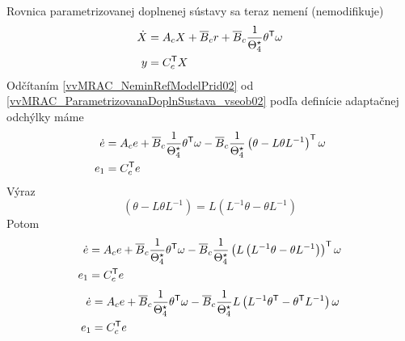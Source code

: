 \documentclass[a4paper, 10pt, ]{article}
\begin{document}
Rovnica parametrizovanej doplnenej sústavy sa teraz nemení (nemodifikuje)
\begin{subequations} \label{vvMRAC_ParametrizovanaDoplnSustava_vseob02}
	\begin{align}
		\dot X &= A_c X + \overline{B}_c r + \overline{B}_c \frac{1}{\Theta_4^\star} \theta^{\mathsf{T}} \omega \\
		y &= C_c^{\mathsf{T}} X
	\end{align}
\end{subequations}
Odčítaním \eqref{vvMRAC_NeminRefModelPrid02} od \eqref{vvMRAC_ParametrizovanaDoplnSustava_vseob02} podľa definície adaptačnej odchýlky máme
\begin{subequations} \label{vvMRAC_adaptOdchSS_MDO01}
	\begin{align}
		\dot e &= A_c e + \overline{B}_c \frac{1}{\Theta_4^\star} \theta^{\mathsf{T}} \omega - \overline{B}_c \frac{1}{\Theta_4^\star} \left( \theta - L \theta L^{-1} \right)^{\mathsf{T}} \omega \\
		e_1 &= C_c^{\mathsf{T}} e
	\end{align}
\end{subequations}
Výraz
\begin{equation}
	\left( \theta - L \theta L^{-1} \right) = L \left( L^{-1} \theta - \theta L^{-1} \right)
\end{equation}
Potom
\begin{subequations} \label{vvMRAC_adaptOdchSS_MDO02}
	\begin{align}
		\dot e &= A_c e + \overline{B}_c \frac{1}{\Theta_4^\star} \theta^{\mathsf{T}} \omega - \overline{B}_c \frac{1}{\Theta_4^\star} \left( L \left( L^{-1} \theta - \theta L^{-1} \right) \right)^{\mathsf{T}} \omega \\
		e_1 &= C_c^{\mathsf{T}} e
	\end{align}
\end{subequations}
\begin{subequations} \label{vvMRAC_adaptOdchSS_MDO03}
	\begin{align}
		\dot e &= A_c e + \overline{B}_c \frac{1}{\Theta_4^\star} \theta^{\mathsf{T}} \omega - \overline{B}_c \frac{1}{\Theta_4^\star} L \left( L^{-1} \theta^{\mathsf{T}} - \theta^{\mathsf{T}} L^{-1} \right) \omega \\
		e_1 &= C_c^{\mathsf{T}} e
	\end{align}
\end{subequations}
\end{document}
